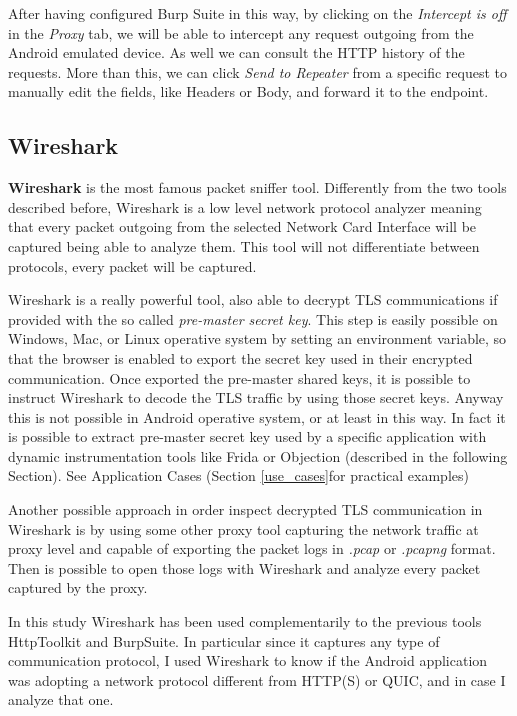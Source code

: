 			\par After having configured Burp Suite in this way, by clicking on the \textit{Intercept is off} in the \textit{Proxy} tab, we will be able to intercept any request outgoing from the Android emulated device. As well we can consult the HTTP history of the requests. More than this, we can click \textit{Send to Repeater} from a specific request to manually edit the fields, like Headers or Body, and forward it to the endpoint.
		
		\subsection{Wireshark}
		\label{sec:wireshark}
			\par \textbf{Wireshark} is the most famous packet sniffer tool. Differently from the two tools described before, Wireshark is a low level network protocol analyzer meaning that every packet outgoing from the selected Network Card Interface will be captured being able to analyze them. This tool will not differentiate between protocols, every packet will be captured. \newline
			\par Wireshark is a really powerful tool, also able to decrypt TLS communications if provided with the so called \textit{pre-master secret key}. This step is easily possible on Windows, Mac, or Linux operative system by setting an environment variable, so that the browser is enabled to export the secret key used in their encrypted communication. Once exported the pre-master shared keys, it is possible to instruct Wireshark to decode the TLS traffic by using those secret keys. Anyway this is not possible in Android operative system, or at least in this way. In fact it is possible to extract pre-master secret key used by a specific application with dynamic instrumentation tools like Frida or Objection (described in the following Section). See Application Cases (Section \ref{use_cases}for practical examples) \newline
			\par Another possible approach in order inspect decrypted TLS communication in Wireshark is by using some other proxy tool capturing the network traffic at proxy level and capable of exporting the packet logs in \textit{.pcap} or \textit{.pcapng} format. Then is possible to open those logs with Wireshark and analyze every packet captured by the proxy.
			\par In this study Wireshark has been used complementarily to the previous tools HttpToolkit and BurpSuite. In particular since it captures any type of communication protocol, I used Wireshark to know if the Android application was adopting a network protocol different from HTTP(S) or QUIC, and in case I analyze that one.
	
